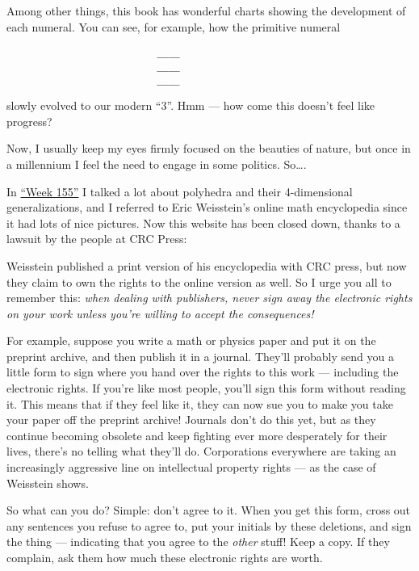 \documentclass{article}
\def\tightlist{}
\renewcommand{\texttt}[1]{%
  \begingroup
  \ttfamily
  \begingroup\lccode`~=`/\lowercase{\endgroup\def~}{/\discretionary{}{}{}}%
  \begingroup\lccode`~=`[\lowercase{\endgroup\def~}{[\discretionary{}{}{}}%
  \begingroup\lccode`~=`.\lowercase{\endgroup\def~}{.\discretionary{}{}{}}%
  \catcode`/=\active\catcode`[=\active\catcode`.=\active
  \scantokens{#1\noexpand}%
  \endgroup
}
\begin{document}
Among other things, this book has wonderful charts showing the
development of each numeral. You can see, for example, how the primitive
numeral

\begin{verbatim}
                          ____
                          ____
                          ____
\end{verbatim}

slowly evolved to our modern ``3''. Hmm --- how come this doesn't feel
like progress?

Now, I usually keep my eyes firmly focused on the beauties of nature,
but once in a millennium I feel the need to engage in some politics.
So\ldots.

In \protect\hyperlink{week155}{``Week 155''} I talked a lot about
polyhedra and their 4-dimensional generalizations, and I referred to
Eric Weisstein's online math encyclopedia since it had lots of nice
pictures. Now this website has been closed down, thanks to a lawsuit by
the people at CRC Press:


Weisstein published a print version of his encyclopedia with CRC press,
but now they claim to own the rights to the online version as well. So I
urge you all to remember this: \emph{when dealing with publishers, never
sign away the electronic rights on your work unless you're willing to
accept the consequences!}

For example, suppose you write a math or physics paper and put it on the
preprint archive, and then publish it in a journal. They'll probably
send you a little form to sign where you hand over the rights to this
work --- including the electronic rights. If you're like most people,
you'll sign this form without reading it. This means that if they feel
like it, they can now sue you to make you take your paper off the
preprint archive! Journals don't do this yet, but as they continue
becoming obsolete and keep fighting ever more desperately for their
lives, there's no telling what they'll do. Corporations everywhere are
taking an increasingly aggressive line on intellectual property rights
--- as the case of Weisstein shows.

So what can you do? Simple: don't agree to it. When you get this form,
cross out any sentences you refuse to agree to, put your initials by
these deletions, and sign the thing --- indicating that you agree to the
\emph{other} stuff! Keep a copy. If they complain, ask them how much
these electronic rights are worth.
\end{document}
